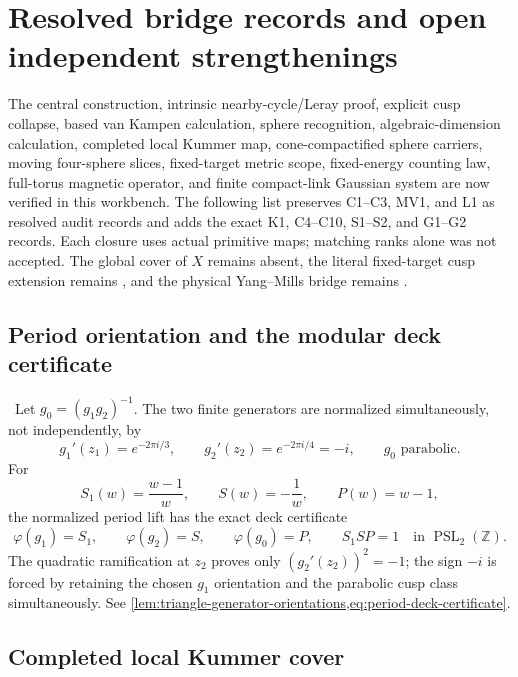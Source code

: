 \section{Resolved bridge records and open independent strengthenings}

The central construction, intrinsic nearby-cycle/Leray proof, explicit cusp
collapse, based van Kampen calculation, sphere recognition,
algebraic-dimension calculation, completed local Kummer map,
cone-compactified sphere carriers, moving four-sphere slices, fixed-target
metric scope, fixed-energy counting law, full-torus magnetic operator, and
finite compact-link Gaussian system are now verified in this workbench.  The
following list preserves C1--C3, MV1, and L1 as resolved audit records and
adds the exact K1, C4--C10, S1--S2, and G1--G2 records.  Each closure uses
actual primitive maps; matching ranks
alone was not accepted.  The global cover of \(X\) remains absent, the
literal fixed-target cusp extension remains \Refuted, and the physical
Yang--Mills bridge remains \Open.

\subsection{Period orientation and the modular deck certificate}

\begin{auditrecord}
\Verified\ Let $g_0=(g_1g_2)^{-1}$.  The two finite generators are
normalized simultaneously, not independently, by
\[
 g_1'(z_1)=e^{-2\pi i/3},\qquad
 g_2'(z_2)=e^{-2\pi i/4}=-i,
 \qquad g_0\text{ parabolic}.
\]
For
\[
 S_1(w)=\frac{w-1}{w},\qquad S(w)=-\frac1w,
 \qquad P(w)=w-1,
\]
the normalized period lift has the exact deck certificate
\[
 \varphi(g_1)=S_1,\qquad \varphi(g_2)=S,\qquad
 \varphi(g_0)=P,\qquad S_1SP=1
 \quad\text{in }\operatorname{PSL}_2(\mathbb Z).
\]
The quadratic ramification at $z_2$ proves only
$(g_2'(z_2))^2=-1$; the sign $-i$ is forced by retaining the chosen
$g_1$ orientation and the parabolic cusp class simultaneously.  See
\cref{lem:triangle-generator-orientations,eq:period-deck-certificate}.
\end{auditrecord}

\subsection{Completed local Kummer cover}

